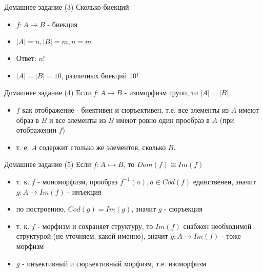 \documentclass{beamer}
\begin{document}
\begin{frame}{Домашнее задание (3)}
Сколько биекций\\
\bigskip
  \begin{itemize}
    \item $f : A \to B$ - биекция
    \item $\left\vert{A}\right\vert = n, \left\vert{B}\right\vert = m, n = m$
    \item Ответ: $n!$
    \item $\left\vert{A}\right\vert = \left\vert{B}\right\vert = 10$, различных биекций 10! 
  \end{itemize}  
\end{frame}

\begin{frame}{Домашнее задание (4)}
Если $f : A \to B$ - изоморфизм групп, то $\left\vert{A}\right\vert = \left\vert{B}\right\vert$\\
\bigskip 
  \begin{itemize}
    \item $f$ как отображение - биективен и сюръективен, т.е. все элементы из $A$ имеют образ в $B$ и все элементы из $B$ имеют ровно один прообраз в $A$ (при отображении $f$)
    \item т. е. $A$ содержит столько же элементов, сколько $B$.
  \end{itemize}  
\end{frame}

\begin{frame}{Домашнее задание (5)}
Если $f : A \rightarrowtail B$, то $Dom(f) \cong Im(f)$\\
\bigskip
  \begin{itemize}
    \item т. к. $f$ - мономорфизм, прообраз $f^{-1}(a), a \in Cod(f)$ единственен, значит $g : A \to Im(f)$ - инъекция
    \item по построению, $Cod(g) = Im(g)$, значит $g$ - сюръекция 
    \item т. к. $f$ - морфизм и сохраняет структуру, то $Im(f)$ снабжен необходимой структурой (не уточняем, какой именно), значит $g : A \to Im(f)$ - тоже морфизм
    \item $g$ - инъективный и сюръективный морфизм, т.е. изоморфизм
  \end{itemize}  
\end{frame}


\end{document}
